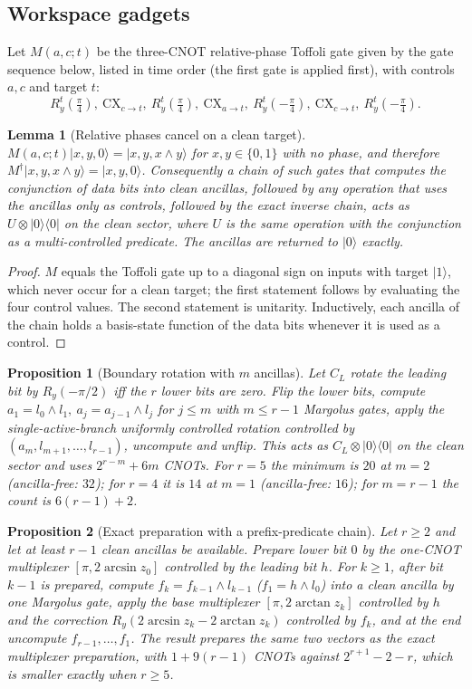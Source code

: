 \documentclass[11pt]{article}
\newtheorem{proposition}{Proposition}
\newtheorem{lemma}{Lemma}
\newcommand{\ket}[1]{\lvert #1\rangle}
\newcommand{\bra}[1]{\langle #1\rvert}
\begin{document}
\subsection{Workspace gadgets}
Let $M(a,c;t)$ be the three-CNOT relative-phase Toffoli gate given by the gate sequence below, listed in time order (the first gate is applied first), with controls $a,c$ and target $t$:
\begin{equation*}
 R_y^t(\tfrac\pi4),\ \mathrm{CX}_{c\to t},\ R_y^t(\tfrac\pi4),\ \mathrm{CX}_{a\to t},\ R_y^t(-\tfrac\pi4),\ \mathrm{CX}_{c\to t},\ R_y^t(-\tfrac\pi4).
\end{equation*}
\begin{lemma}[Relative phases cancel on a clean target]\label{lem:margolus}
$M(a,c;t)\ket{x,y,0}=\ket{x,y,x\wedge y}$ for $x,y\in\{0,1\}$ with no phase, and therefore $M^\dagger\ket{x,y,x\wedge y}=\ket{x,y,0}$. Consequently a chain of such gates that computes the conjunction of data bits into clean ancillas, followed by any operation that uses the ancillas only as controls, followed by the exact inverse chain, acts as $U\otimes\ket0\bra0$ on the clean sector, where $U$ is the same operation with the conjunction as a multi-controlled predicate. The ancillas are returned to $\ket0$ exactly.
\end{lemma}
\begin{proof}
$M$ equals the Toffoli gate up to a diagonal sign on inputs with target $\ket1$, which never occur for a clean target; the first statement follows by evaluating the four control values. The second statement is unitarity. Inductively, each ancilla of the chain holds a basis-state function of the data bits whenever it is used as a control.
\end{proof}
\begin{proposition}[Boundary rotation with $m$ ancillas]\label{prop:boundary}
Let $C_L$ rotate the leading bit by $R_y(-\pi/2)$ iff the $r$ lower bits are zero. Flip the lower bits, compute $a_1=l_0\wedge l_1,\ a_j=a_{j-1}\wedge l_j$ for $j\le m$ with $m\le r-1$ Margolus gates, apply the single-active-branch uniformly controlled rotation controlled by $(a_m,l_{m+1},\dots,l_{r-1})$, uncompute and unflip. This acts as $C_L\otimes\ket0\bra0$ on the clean sector and uses $2^{r-m}+6m$ CNOTs. For $r=5$ the minimum is $20$ at $m=2$ (ancilla-free: $32$); for $r=4$ it is $14$ at $m=1$ (ancilla-free: $16$); for $m=r-1$ the count is $6(r-1)+2$.
\end{proposition}
\begin{proposition}[Exact preparation with a prefix-predicate chain]\label{prop:chain}
Let $r\ge2$ and let at least $r-1$ clean ancillas be available. Prepare lower bit $0$ by the one-CNOT multiplexer $[\pi,2\arcsin z_0]$ controlled by the leading bit $h$. For $k\ge1$, after bit $k-1$ is prepared, compute $f_k=f_{k-1}\wedge l_{k-1}$ ($f_1=h\wedge l_0$) into a clean ancilla by one Margolus gate, apply the base multiplexer $[\pi,2\arctan z_k]$ controlled by $h$ and the correction $R_y(2\arcsin z_k-2\arctan z_k)$ controlled by $f_k$, and at the end uncompute $f_{r-1},\dots,f_1$. The result prepares the same two vectors as the exact multiplexer preparation, with $1+9(r-1)$ CNOTs against $2^{r+1}-2-r$, which is smaller exactly when $r\ge5$.
\end{proposition}
\end{document}
